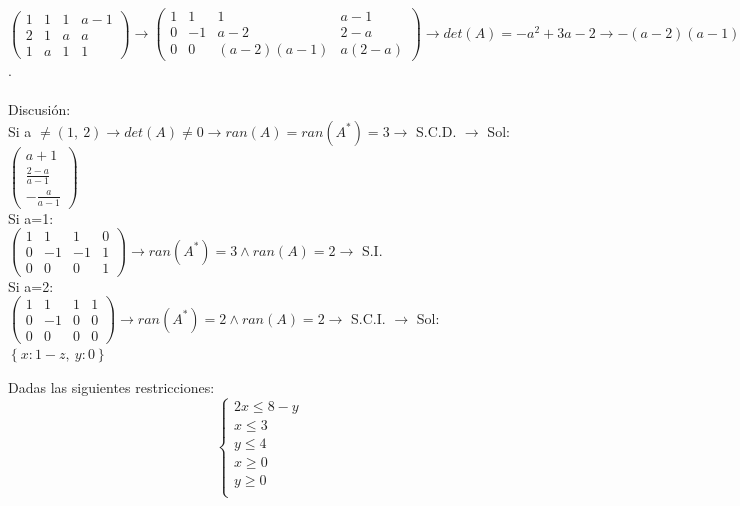 \documentclass[addpoints,spanish, 12pt,a4paper]{exam}
\begin{document}
\begin{questions}
\begin{parts}
\end{parts}
\begin{solution}
$\left(\begin{matrix}1 & 1 & 1 & a - 1\\2 & 1 & a & a\\1 & a & 1 & 1\end{matrix}\right) \to \left(\begin{matrix}1 & 1 & 1 & a - 1\\0 & -1 & a - 2 & 2 - a\\0 & 0 & \left(a - 2\right) \left(a - 1\right) & a \left(2 - a\right)\end{matrix}\right)\to det(A)=- a^{2} + 3 a - 2\to- \left(a - 2\right) \left(a - 1\right)$. \\ \\ Discusión: \\Si a $\neq\left( 1, \  2\right)\to det(A) \neq 0 \to ran(A)=ran(A^*)=3 \to $ S.C.D. $\to$ Sol:$\left(\begin{matrix}a + 1\\\frac{2 - a}{a - 1}\\- \frac{a}{a - 1}\end{matrix}\right)$ \\Si a=1: \\ $\left(\begin{matrix}1 & 1 & 1 & 0\\0 & -1 & -1 & 1\\0 & 0 & 0 & 1\end{matrix}\right) \to ran(A^*)=3 \land ran(A)=2 \to$  S.I. \\Si a=2: \\ $\left(\begin{matrix}1 & 1 & 1 & 1\\0 & -1 & 0 & 0\\0 & 0 & 0 & 0\end{matrix}\right) \to ran(A^*)=2 \land ran(A)=2 \to$  S.C.I.  $\to$ Sol:$\left\{ x : 1 - z, \  y : 0\right\}$
\end{solution}
\addpoints



\question Dadas las siguientes restricciones: $$\left\{\begin{matrix}
2x  \leqslant  8 - y\\
x  \leqslant  3\\
y  \leqslant  4\\
x  \geqslant  0 \\
y  \geqslant  0 \\
\end{matrix}\right.$$ 


\end{questions}
\end{document}

